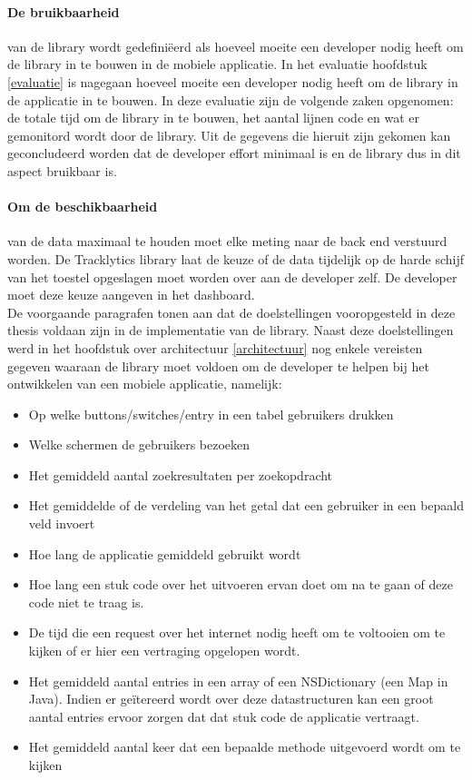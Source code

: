 \paragraph{De bruikbaarheid} van de library wordt gedefini\"eerd als hoeveel moeite een developer nodig heeft om de library in te bouwen in de mobiele applicatie. In het evaluatie hoofdstuk \ref{evaluatie} is nagegaan hoeveel moeite een developer nodig heeft om de library in de applicatie in te bouwen. In deze evaluatie zijn de volgende zaken opgenomen: de totale tijd om de library in te bouwen, het aantal lijnen code en wat er gemonitord wordt door de library. Uit de gegevens die hieruit zijn gekomen kan geconcludeerd worden dat de developer effort minimaal is en de library dus in dit aspect bruikbaar is.

\paragraph{Om de beschikbaarheid} van de data maximaal te houden moet elke meting naar de back end verstuurd worden. De Tracklytics library laat de keuze of de data tijdelijk op de harde schijf van het toestel opgeslagen moet worden over aan de developer zelf. De developer moet deze keuze aangeven in het dashboard. \\

De voorgaande paragrafen tonen aan dat de doelstellingen vooropgesteld in deze thesis voldaan zijn in de implementatie van de library. Naast deze doelstellingen werd in het hoofdstuk over architectuur \ref{architectuur} nog enkele vereisten gegeven waaraan de library moet voldoen om de developer te helpen bij het ontwikkelen van een mobiele applicatie, namelijk: 
\begin{itemize}
\item Op welke buttons/switches/entry in een tabel gebruikers drukken
\item Welke schermen de gebruikers bezoeken
\item Het gemiddeld aantal zoekresultaten per zoekopdracht
\item Het gemiddelde of de verdeling van het getal dat een gebruiker in een bepaald veld invoert
\item Hoe lang de applicatie gemiddeld gebruikt wordt
\item Hoe lang een stuk code over het uitvoeren ervan doet om na te gaan of deze code niet te traag is.
\item De tijd die een request over het internet nodig heeft om te voltooien om te kijken of er hier een vertraging opgelopen wordt.
\item Het gemiddeld aantal entries in een array of een NSDictionary (een Map in Java). Indien er ge\"itereerd wordt over deze datastructuren kan een groot aantal entries ervoor zorgen dat dat stuk code de applicatie vertraagt.
\item Het gemiddeld aantal keer dat een bepaalde methode uitgevoerd wordt om te kijken
\end{itemize}

